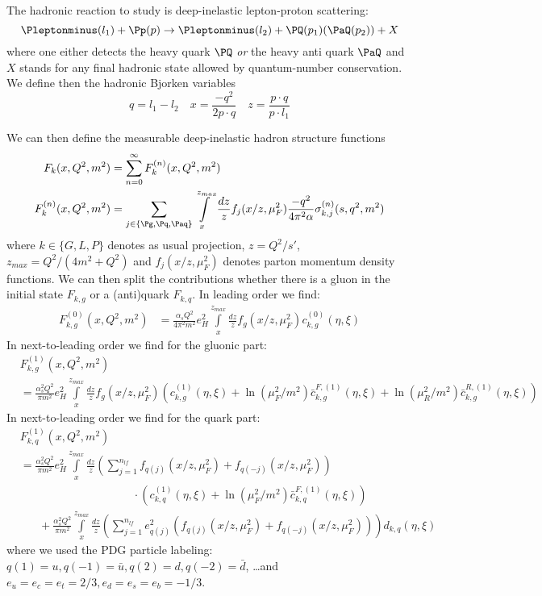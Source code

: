 The hadronic reaction to study is deep-inelastic lepton-proton scattering:
\begin{equation}
\Pleptonminus(l_1) + \Pp(p) \rightarrow \Pleptonminus(l_2) + \PQ(p_1)(\PaQ(p_2)) + X
\end{equation}
where one either detects the heavy quark $\PQ$ \textit{or} the heavy anti quark $\PaQ$ and $X$ stands for any final hadronic state allowed by quantum-number conservation. We define then the hadronic Bjorken variables
\begin{equation}
q=l_1-l_2 \quad x=\frac{-q^2}{2p\cdot q} \quad z = \frac{p\cdot q}{p\cdot l_1}
\end{equation}

We can then define the measurable deep-inelastic hadron structure functions
\begin{align}
F_k(x,Q^2,m^2) &= \sum_{n=0}^\infty F_{k}^{(n)}(x,Q^2,m^2)\\
F_{k}^{(n)}(x,Q^2,m^2) &= \sum_{j\in\{\Pg,\Pq,\Paq\}}\int\limits_x^{z_{max}} \frac{dz}{z} f_j(x/z,\mu_F^2) \frac{-q^2}{4\pi^2\alpha} \sigma^{(n)}_{k,j}(s,q^2,m^2)
\end{align}
where $k\in\{G,L,P\}$ denotes as usual projection, $z=Q^2/s'$, $z_{max} = Q^2/(4m^2+Q^2)$ and $f_j(x/z,\mu_F^2)$ denotes parton momentum density functions\cite{Martin:2009iq,PhysRevLett.113.012001}.
We can then split the contributions whether there is a gluon in the initial state $F_{k,g}$ or a (anti)quark $F_{k,q}$. In leading order we find:
\begin{align}
F_{k,g}^{(0)}(x,Q^2,m^2) &= \frac{\alpha_sQ^2}{4\pi^2m^2}e_H^2\int\limits_x^{z_{max}}\frac{dz}{z} f_g(x/z,\mu_F^2) c^{(0)}_{k,g}(\eta,\xi)
\end{align}
In next-to-leading order we find for the gluonic part:
\begin{align}
&F_{k,g}^{(1)}(x,Q^2,m^2) \nonumber\\
 &= \frac{\alpha_s^2Q^2}{\pi m^2}e_H^2\int\limits_x^{z_{max}}\frac{dz}{z} f_g(x/z,\mu_F^2) \left(c_{k,g}^{(1)}(\eta,\xi) + \ln(\mu_F^2/m^2)\bar c_{k,g}^{F,(1)}(\eta,\xi) + \ln(\mu_R^2/m^2)\bar c_{k,g}^{R,(1)}(\eta,\xi)\right)
\end{align}
In next-to-leading order we find for the quark part:
\begin{align}
&F_{k,q}^{(1)}(x,Q^2,m^2) \nonumber\\
 &= \frac{\alpha_s^2Q^2}{\pi m^2}e_H^2\int\limits_x^{z_{max}}\frac{dz}{z} \left(\sum_{j=1}^{n_{lf}}f_{q(j)}(x/z,\mu_F^2)+f_{q(-j)}(x/z,\mu_F^2)\right) \nonumber\\
 &\hspace{120pt} \cdot\left(c_{k,q}^{(1)}(\eta,\xi) + \ln(\mu_F^2/m^2)\bar c_{k,q}^{F,(1)}(\eta,\xi)\right) \nonumber\\
 &\hspace{20pt} + \frac{\alpha_s^2Q^2}{\pi m^2}\int\limits_x^{z_{max}}\frac{dz}{z} \left(\sum_{j=1}^{n_{lf}}e_{q(j)}^2\left(f_{q(j)}(x/z,\mu_F^2)+f_{q(-j)}(x/z,\mu_F^2)\right)\right) d_{k,q}(\eta,\xi)
\end{align}
where we used the PDG particle labeling\cite{Hagiwara:2002fs}: $q(1)=u,q(-1)=\bar u,q(2)=d,q(-2)=\bar d$, \ldots and $e_u = e_c = e_t = 2/3, e_d=e_s=e_b=-1/3$. 

